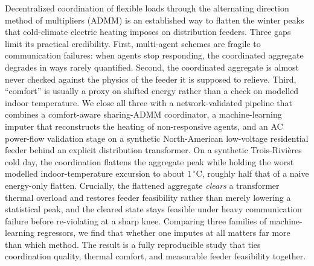 Decentralized coordination of flexible loads through the alternating direction
method of multipliers (ADMM) is an established way to flatten the winter peaks
that cold-climate electric heating imposes on distribution feeders. Three gaps
limit its practical credibility. First, multi-agent schemes are fragile to
communication failures: when agents stop responding, the coordinated aggregate
degrades in ways rarely quantified. Second, the coordinated aggregate is almost
never checked against the physics of the feeder it is supposed to relieve. Third,
``comfort'' is usually a proxy on shifted energy rather than a check on modelled
indoor temperature. We close all three with a network-validated pipeline that
combines a comfort-aware sharing-ADMM coordinator, a machine-learning imputer
that reconstructs the heating of non-responsive agents, and an AC power-flow
validation stage on a synthetic North-American low-voltage residential feeder
behind an explicit distribution transformer. On a synthetic Trois-Rivi\`eres cold
day, the coordination flattens the aggregate peak while holding the worst modelled
indoor-temperature excursion to about $1\,^{\circ}\mathrm{C}$, roughly half that of
a naive energy-only flatten. Crucially, the flattened aggregate \emph{clears} a
transformer thermal overload and restores feeder feasibility rather than merely
lowering a statistical peak, and the cleared state stays feasible under heavy
communication failure before re-violating at a sharp knee. Comparing three
families of machine-learning regressors, we find that whether one imputes at all
matters far more than which method. The result is a fully reproducible study that
ties coordination quality, thermal comfort, and measurable feeder feasibility
together.
